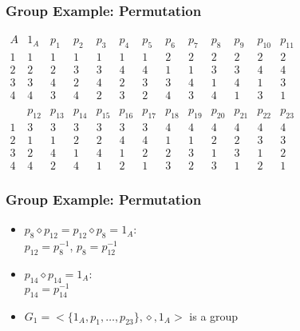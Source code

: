 \documentclass[dvipsnames]{beamer}
\begin{document}
\begin{frame}
  \frametitle{Group Example: Permutation}

  \begin{example}[permutations on $\{1,2,3,4\}$]
    $\begin{array}{c|cccccccccccccccccccccccc}
        A & 1_{A}  & p_{1}  & p_{2}  & p_{3}  & p_{4}  & p_{5}
          & p_{6}  & p_{7}  & p_{8}  & p_{9}  & p_{10} & p_{11}\\\hline
        1 &   1    &   1    &   1    &   1    &   1    &  1
          &   2    &   2    &   2    &   2    &   2    &  2\\
        2 &   2    &   2    &   3    &   3    &   4    &  4
          &   1    &   1    &   3    &   3    &   4    &  4\\
        3 &   3    &   4    &   2    &   4    &   2    &  3
          &   3    &   4    &   1    &   4    &   1    &  3\\
        4 &   4    &   3    &   4    &   2    &   3    &  2
          &   4    &   3    &   4    &   1    &   3    &  1\\\\
          & p_{12} & p_{13} & p_{14} & p_{15} & p_{16} & p_{17}
          & p_{18} & p_{19} & p_{20} & p_{21} & p_{22} & p_{23}\\\hline
        1 &   3    &   3    &   3    &   3    &   3    &  3
          &   4    &   4    &   4    &   4    &   4    &  4\\
        2 &   1    &   1    &   2    &   2    &   4    &  4
          &   1    &   1    &   2    &   2    &   3    &  3\\
        3 &   2    &   4    &   1    &   4    &   1    &  2
          &   2    &   3    &   1    &   3    &   1    &  2\\
        4 &   4    &   2    &   4    &   1    &   2    &  1
          &   3    &   2    &   3    &   1    &   2    &  1
      \end{array}$
  \end{example}
\end{frame}

\begin{frame}
  \frametitle{Group Example: Permutation}

  \begin{example}
    \begin{itemize}
      \item $p_8 \diamond p_{12}=p_{12} \diamond p_8=1_A$:\\
        $p_{12} = p_8^{-1}$, $p_8 = p_{12}^{-1}$
      \item $p_{14} \diamond p_{14}=1_A$:\\
        $p_{14} = p_{14}^{-1}$

      \pause
      \bigskip
      \item $G_1=<\{1_A,p_1,\dots,p_{23}\},\diamond,1_A>$ is a group
    \end{itemize}
  \end{example}
\end{frame}
\end{document}
